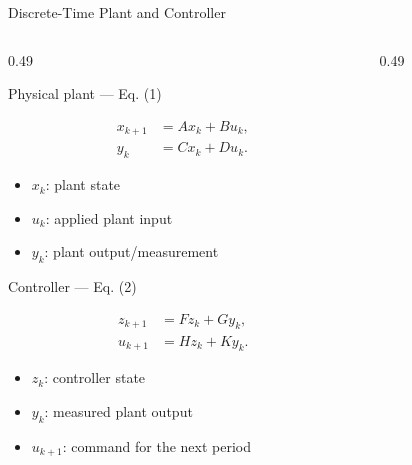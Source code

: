 \documentclass[9pt,aspectratio=169]{beamer}
\newcommand{\tightitemize}{
    \setlength{\itemsep}{1.5pt}
    \setlength{\parskip}{0pt}
    \setlength{\topsep}{2pt}
}
\begin{document}
\begin{frame}{Discrete-Time Plant and Controller}

\begin{columns}[T,onlytextwidth]

\begin{column}{0.49\textwidth}

\begin{block}{Physical plant --- Eq. (1)}

\[
\boxed{
\begin{aligned}
x_{k+1}&=Ax_k+Bu_k,\\
y_k&=Cx_k+Du_k.
\end{aligned}
}
\]

\vspace{-1mm}

\begin{itemize}
\tightitemize
    \item $x_k$: plant state
    \item $u_k$: applied plant input
    \item $y_k$: plant output/measurement
\end{itemize}

\end{block}

\begin{block}{Controller --- Eq. (2)}

\[
\boxed{
\begin{aligned}
z_{k+1}&=Fz_k+Gy_k,\\
u_{k+1}&=Hz_k+Ky_k.
\end{aligned}
}
\]

\vspace{-1mm}

\begin{itemize}
\tightitemize
    \item $z_k$: controller state
    \item $y_k$: measured plant output
    \item $u_{k+1}$: command for the next period
\end{itemize}

\end{block}

\end{column}


\begin{column}{0.49\textwidth}


\end{column}
\end{columns}
\end{frame}
\end{document}
